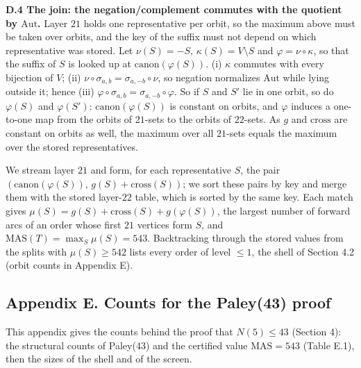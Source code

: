 \documentclass[
]{article}
\begin{document}
\textbf{D.4 The join: the negation/complement commutes with the quotient
by \(\mathrm{Aut}\).} Layer \(21\) holds one representative per orbit,
so the maximum above must be taken over orbits, and the key of the
suffix must not depend on which representative was stored. Let
\(\nu(S) = -S\), \(\kappa(S) = V \setminus S\) and
\(\varphi = \nu \circ \kappa\), so that the suffix of \(S\) is looked up
at \(\mathrm{canon}(\varphi(S))\). (i) \(\kappa\) commutes with every
bijection of \(V\); (ii)
\(\nu \circ \sigma_{a,b} = \sigma_{a,-b} \circ \nu\), so negation
normalizes \(\mathrm{Aut}\) while lying outside it; hence (iii)
\(\varphi \circ \sigma_{a,b} = \sigma_{a,-b} \circ \varphi\). So if
\(S\) and \(S'\) lie in one orbit, so do \(\varphi(S)\) and
\(\varphi(S')\): \(\mathrm{canon}(\varphi(S))\) is constant on orbits,
and \(\varphi\) induces a one-to-one map from the orbits of \(21\)-sets
to the orbits of \(22\)-sets. As \(g\) and \(\mathrm{cross}\) are
constant on orbits as well, the maximum over all \(21\)-sets equals the
maximum over the stored representatives.

We stream layer \(21\) and form, for each representative \(S\), the pair
\((\mathrm{canon}(\varphi(S)),\, g(S) + \mathrm{cross}(S))\); we sort
these pairs by key and merge them with the stored layer-\(22\) table,
which is sorted by the same key. Each match gives
\(\mu(S) = g(S) + \mathrm{cross}(S) + g(\varphi(S))\), the largest
number of forward arcs of an order whose first \(21\) vertices form
\(S\), and \(\mathrm{MAS}(T) = \max_S \mu(S) = 543\). Backtracking
through the stored values from the splits with \(\mu(S) \ge 542\) lists
every order of level \(\le 1\), the shell of Section 4.2 (orbit counts
in Appendix E).

\setcounter{table}{0}\setcounter{figure}{0}

\subsection{Appendix E. Counts for the Paley(43)
proof}\label{appendix-e.-counts-for-the-paley43-proof}

This appendix gives the counts behind the proof that \(N(5) \le 43\)
(Section 4): the structural counts of Paley(43) and the certified value
\(\mathrm{MAS} = 543\) (Table E.1), then the sizes of the shell and of
the screen.
\end{document}
